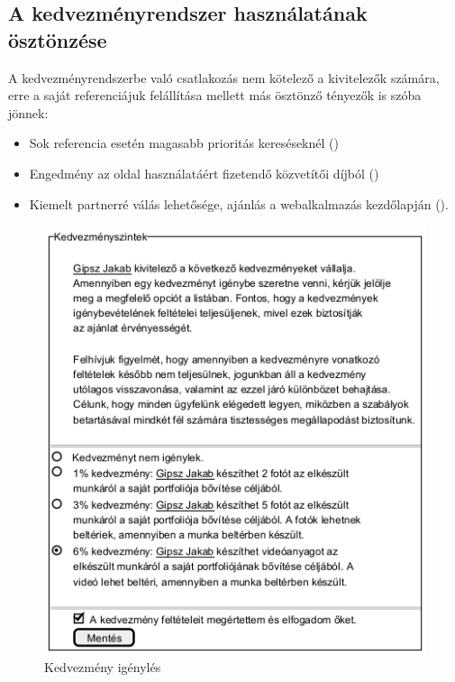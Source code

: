 \subsection{A kedvezményrendszer használatának ösztönzése}
A kedvezményrendszerbe való csatlakozás nem kötelező a kivitelezők számára, erre a saját referenciájuk felállítása mellett más ösztönző tényezők is szóba jönnek:
\begin{itemize}
\item Sok referencia esetén magasabb prioritás kereséseknél ()
\item Engedmény az oldal használatáért fizetendő közvetítői díjból ()
\item Kiemelt partnerré válás lehetősége, ajánlás a webalkalmazás kezdőlapján ().
\end{itemize} 

\begin{figure}[h]
	\centering
	\includegraphics[scale=0.7]{img/kedvezmeny.png}
	\caption{Kedvezmény igénylés}
	\label{fig:kedvez}
\end{figure}